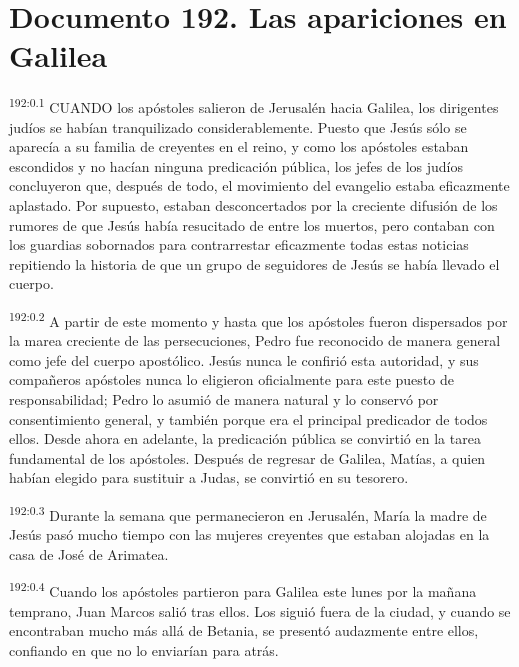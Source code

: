 \chapter{Documento 192. Las apariciones en Galilea}
\par 
\textsuperscript{192:0.1} CUANDO los apóstoles salieron de Jerusalén hacia Galilea, los dirigentes judíos se habían tranquilizado considerablemente. Puesto que Jesús sólo se aparecía a su familia de creyentes en el reino, y como los apóstoles estaban escondidos y no hacían ninguna predicación pública, los jefes de los judíos concluyeron que, después de todo, el movimiento del evangelio estaba eficazmente aplastado. Por supuesto, estaban desconcertados por la creciente difusión de los rumores de que Jesús había resucitado de entre los muertos, pero contaban con los guardias sobornados para contrarrestar eficazmente todas estas noticias repitiendo la historia de que un grupo de seguidores de Jesús se había llevado el cuerpo.

\par 
\textsuperscript{192:0.2} A partir de este momento y hasta que los apóstoles fueron dispersados por la marea creciente de las persecuciones, Pedro fue reconocido de manera general como jefe del cuerpo apostólico. Jesús nunca le confirió esta autoridad, y sus compañeros apóstoles nunca lo eligieron oficialmente para este puesto de responsabilidad; Pedro lo asumió de manera natural y lo conservó por consentimiento general, y también porque era el principal predicador de todos ellos. Desde ahora en adelante, la predicación pública se convirtió en la tarea fundamental de los apóstoles. Después de regresar de Galilea, Matías, a quien habían elegido para sustituir a Judas, se convirtió en su tesorero.

\par 
\textsuperscript{192:0.3} Durante la semana que permanecieron en Jerusalén, María la madre de Jesús pasó mucho tiempo con las mujeres creyentes que estaban alojadas en la casa de José de Arimatea.

\par 
\textsuperscript{192:0.4} Cuando los apóstoles partieron para Galilea este lunes por la mañana temprano, Juan Marcos salió tras ellos. Los siguió fuera de la ciudad, y cuando se encontraban mucho más allá de Betania, se presentó audazmente entre ellos, confiando en que no lo enviarían para atrás.

